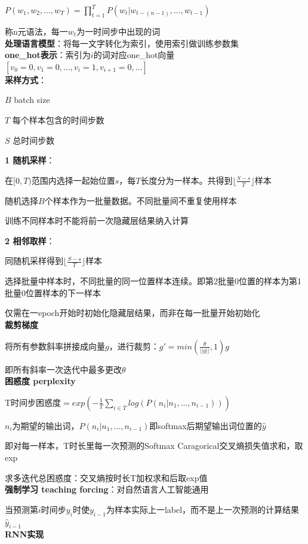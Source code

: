 \documentclass[UTF8]{ctexart}
\begin{document}
  $P(w_1, w_2,...,w_T) = \prod_{t=1}^{T} P(w_t|w_{t-(n-1)},...,w_{t-1})$

  称n元语法，每一$w_t$为一时间步中出现的词\\
\textbf{处理语言模型}：将每一文字转化为索引，使用索引做训练参数集\\
\textbf{one\_hot表示}：索引为$i$的词对应one\_hot向量$[v_0 = 0, v_1 = 0, ..., v_i = 1, v_{i+1} = 0, ...]$\\
\textbf{采样方式}：

  $B$ batch size
  
  $T$ 每个样本包含的时间步数

  $S$ 总时间步数

  \textbf{1 随机采样}：

  \quad 在$[0, T)$范围内选择一起始位置$s$，每$T$长度分为一样本。共得到$\lfloor \frac{S - s}{T} \rfloor$样本

  \quad 随机选择$B$个样本作为一批量数据。不同批量间不重复使用样本

  \quad 训练不同样本时不能将前一次隐藏层结果纳入计算
  
  \textbf{2 相邻取样}：

  \quad 同随机采样得到$\lfloor \frac{S - s}{T} \rfloor$样本

  \quad 选择批量中样本时，不同批量的同一位置样本连续。即第2批量0位置的样本为第1批量0位置样本的下一样本

  \quad 仅需在一epoch开始时初始化隐藏层结果，而非在每一批量开始初始化\\
\textbf{裁剪梯度}

  将所有参数斜率拼接成向量$g$，进行裁剪：$g' = min(\frac{\theta}{||g||}, 1)g$
  
  \quad 即所有斜率一次迭代中最多更改$\theta$\\
\textbf{困惑度 perplexity}

  T时间步困惑度$ = exp(-\frac{1}{T}\sum_{i \in T} log(P(n_i | n_1, ..., n_{i-1})))$

  \quad $n_i$为期望的输出词，$P(n_i | n_1, ..., n_{i-1})$即softmax后期望输出词位置的$\hat{y}$

  \quad 即对每一样本，T时长里每一次预测的Softmax Caragorical交叉熵损失值求和，取exp
  
  求多迭代总困惑度：交叉熵按时长T加权求和后取exp值\\
\textbf{强制学习 teaching forcing}：对自然语言人工智能通用

  当预测第$i$时间步$y_i$时使$y_{i-1}$为样本实际上一label，而不是上一次预测的计算结果$\hat{y}_{i-1}$\\
\textbf{RNN实现}
\end{document}
